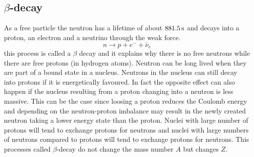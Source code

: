 \documentclass[12pt]{article}
\begin{document}
\subsection{$\beta$-decay}
%
%
%
As a free particle the neutron has a lifetime of about $881.5\,\rm{s}$ and decays into a proton, an electron and a neutrino through the weak force. 
\begin{equation}\label{eq:beta}
n\rightarrow p+e^-+\bar{\nu}_e
\end{equation}
this process is called a $\beta$ decay and it explains why there is no free neutrons while there are free protons (in hydrogen atoms). Neutron can be long lived when they are part of a bound state in a nucleus. Neutrons in the nucleus can still decay into protons if it is energetically favoured. In fact the opposite effect can also happen if the nucleus resulting from a proton changing into a neutron is less massive. This can be the case since loosing a proton reduces the Coulomb energy and depending on the neutron-proton imbalance may result in the newly created neutron taking a lower energy state than the proton. Nuclei with large number of protons will tend to exchange protons for neutrons and nuclei with large numbers of neutrons compared to protons will tend to exchange protons for neutrons. This processes called $\beta$-decay do not change the mass number $A$ but changes $Z$. 
\end{document}
